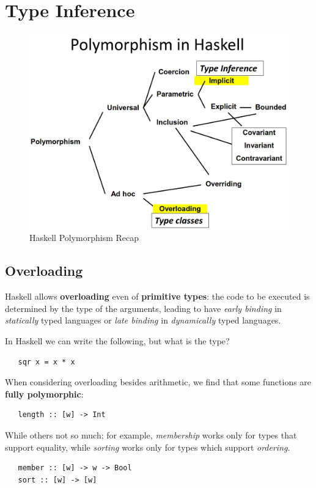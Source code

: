 \chapter{Type Inference}
\begin{figure}[htbp]
   \centering
   \includegraphics{images/haskell_polymorphism.png}
   \caption{Haskell Polymorphism Recap}
   \label{fig:haskell_polymorphism}
\end{figure}

\section{Overloading}
Haskell allows \textbf{overloading} even of \textbf{primitive types}:
the code to be executed is determined by the type of the arguments,
leading to have \textit{early binding} in \textit{statically} typed languages
or \textit{late binding} in \textit{dynamically} typed languages.

In Haskell we can write the following, but what is the type?
\begin{lstlisting}
   sqr x = x * x
\end{lstlisting}

When considering overloading besides arithmetic, we find that some functions are \textbf{fully polymorphic}:
\begin{lstlisting}
   length :: [w] -> Int
\end{lstlisting}

While others not so much;
for example, \textit{membership} works only for types that support equality,
while \textit{sorting} works only for types which support \textit{ordering}. 
\begin{lstlisting}
   member :: [w] -> w -> Bool
   sort :: [w] -> [w]
\end{lstlisting}

